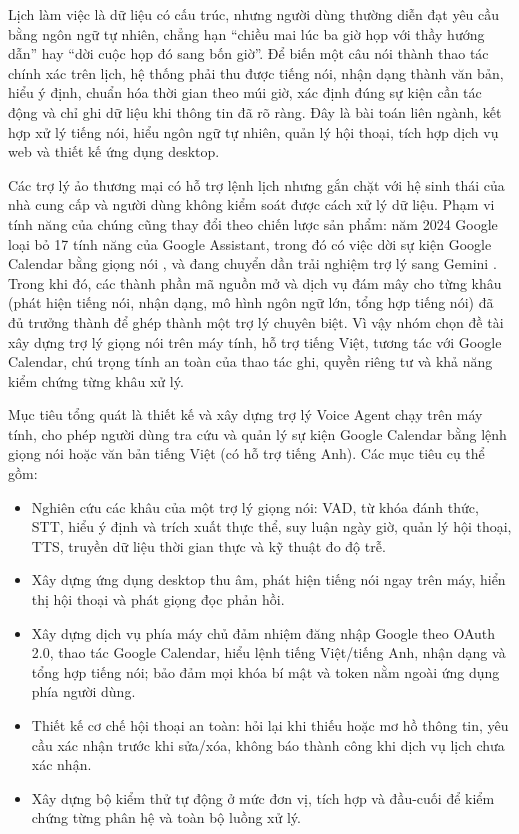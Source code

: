 \newcommand{\mucmodau}[1]{\par\vspace{4pt}{\bfseries #1}\par\nopagebreak}

\mucmodau{1. Lý do chọn đề tài}
Lịch làm việc là dữ liệu có cấu trúc, nhưng người dùng thường diễn đạt yêu cầu bằng ngôn ngữ tự nhiên, chẳng hạn “chiều mai lúc ba giờ họp với thầy hướng dẫn” hay “dời cuộc họp đó sang bốn giờ”. Để biến một câu nói thành thao tác chính xác trên lịch, hệ thống phải thu được tiếng nói, nhận dạng thành văn bản, hiểu ý định, chuẩn hóa thời gian theo múi giờ, xác định đúng sự kiện cần tác động và chỉ ghi dữ liệu khi thông tin đã rõ ràng. Đây là bài toán liên ngành, kết hợp xử lý tiếng nói, hiểu ngôn ngữ tự nhiên, quản lý hội thoại, tích hợp dịch vụ web và thiết kế ứng dụng desktop.

Các trợ lý ảo thương mại có hỗ trợ lệnh lịch nhưng gắn chặt với hệ sinh thái của nhà cung cấp và người dùng không kiểm soát được cách xử lý dữ liệu. Phạm vi tính năng của chúng cũng thay đổi theo chiến lược sản phẩm: năm 2024 Google loại bỏ 17 tính năng của Google Assistant, trong đó có việc dời sự kiện Google Calendar bằng giọng nói \cite{tcassistant}, và đang chuyển dần trải nghiệm trợ lý sang Gemini \cite{ninetofive}. Trong khi đó, các thành phần mã nguồn mở và dịch vụ đám mây cho từng khâu (phát hiện tiếng nói, nhận dạng, mô hình ngôn ngữ lớn, tổng hợp tiếng nói) đã đủ trưởng thành để ghép thành một trợ lý chuyên biệt. Vì vậy nhóm chọn đề tài xây dựng trợ lý giọng nói trên máy tính, hỗ trợ tiếng Việt, tương tác với Google Calendar, chú trọng tính an toàn của thao tác ghi, quyền riêng tư và khả năng kiểm chứng từng khâu xử lý.

\mucmodau{2. Mục đích nghiên cứu}
Mục tiêu tổng quát là thiết kế và xây dựng trợ lý Voice Agent chạy trên máy tính, cho phép người dùng tra cứu và quản lý sự kiện Google Calendar bằng lệnh giọng nói hoặc văn bản tiếng Việt (có hỗ trợ tiếng Anh). Các mục tiêu cụ thể gồm:
\begin{itemize}
  \item Nghiên cứu các khâu của một trợ lý giọng nói: VAD, từ khóa đánh thức, STT, hiểu ý định và trích xuất thực thể, suy luận ngày giờ, quản lý hội thoại, TTS, truyền dữ liệu thời gian thực và kỹ thuật đo độ trễ.
  \item Xây dựng ứng dụng desktop thu âm, phát hiện tiếng nói ngay trên máy, hiển thị hội thoại và phát giọng đọc phản hồi.
  \item Xây dựng dịch vụ phía máy chủ đảm nhiệm đăng nhập Google theo OAuth 2.0, thao tác Google Calendar, hiểu lệnh tiếng Việt/tiếng Anh, nhận dạng và tổng hợp tiếng nói; bảo đảm mọi khóa bí mật và token nằm ngoài ứng dụng phía người dùng.
  \item Thiết kế cơ chế hội thoại an toàn: hỏi lại khi thiếu hoặc mơ hồ thông tin, yêu cầu xác nhận trước khi sửa/xóa, không báo thành công khi dịch vụ lịch chưa xác nhận.
  \item Xây dựng bộ kiểm thử tự động ở mức đơn vị, tích hợp và đầu-cuối để kiểm chứng từng phân hệ và toàn bộ luồng xử lý.
\end{itemize}

